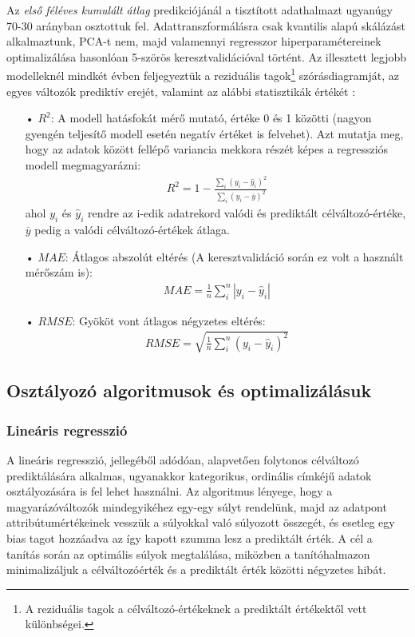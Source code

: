 \documentclass[12pt]{article}
\begin{document}
Az \textit{első féléves kumulált átlag} predikciójánál a tisztított adathalmazt ugyanúgy 70-30 arányban osztottuk fel. Adattranszformálásra csak kvantilis alapú skálázást alkalmaztunk, PCA-t nem, majd valamennyi regresszor hiperparamétereinek optimalizálása hasonlóan 5-szörös keresztvalidációval történt. Az illesztett legjobb modelleknél mindkét évben feljegyeztük a reziduális tagok\footnote{A reziduális tagok a célváltozó-értékeknek a prediktált értékektől vett különbségei.} szórásdiagramját, az egyes változók prediktív erejét, valamint az alábbi statisztikák értékét \cite{bolla_stat}:
\begin{itemize}
\item[•] $R^2$: A modell hatásfokát mérő mutató, értéke 0 és 1 közötti (nagyon gyengén teljesítő modell esetén negatív értéket is felvehet). Azt mutatja meg, hogy az adatok között fellépő variancia mekkora részét képes a regressziós modell megmagyarázni:
\begin{align}
R^2 = 1 - \frac{\sum_i (y_i - \hat{y}_i)^2}{\sum_i (y_i - \overline{y})^2}
\end{align} 
ahol $y_i$ és $\hat{y}_i$ rendre az i-edik adatrekord valódi és prediktált célváltozó-értéke, $\overline{y}$ pedig a valódi célváltozó-értékek átlaga.
\item[•] $MAE$: Átlagos abszolút eltérés (A keresztvalidáció során ez volt a használt mérőszám is):
\begin{align}
MAE = \frac{1}{n}\sum_i^n |y_i -\hat{y}_i| 
\end{align}
\item[•] $RMSE$: Gyököt vont átlagos négyzetes eltérés:
\begin{align}
RMSE = \sqrt{\frac{1}{n}\sum_i^n (y_i - \hat{y}_i)^2}
\end{align}
\end{itemize}






\subsection{Osztályozó algoritmusok és optimalizálásuk}

\subsubsection{Lineáris regresszió}

A lineáris regresszió, jellegéből adódóan, alapvetően folytonos célváltozó prediktálására alkalmas, ugyanakkor kategorikus, ordinális címkéjű adatok osztályozására is fel lehet használni. Az algoritmus lényege, hogy a magyarázóváltozók mindegyikéhez egy-egy súlyt rendelünk, majd az adatpont attribútumértékeinek vesszük a súlyokkal való súlyozott összegét, és esetleg egy bias tagot hozzáadva az így kapott szumma lesz a prediktált érték. A cél a tanítás során az optimális súlyok megtalálása, miközben a tanítóhalmazon minimalizáljuk a célváltozóérték és a prediktált érték közötti négyzetes hibát.
\end{document}

